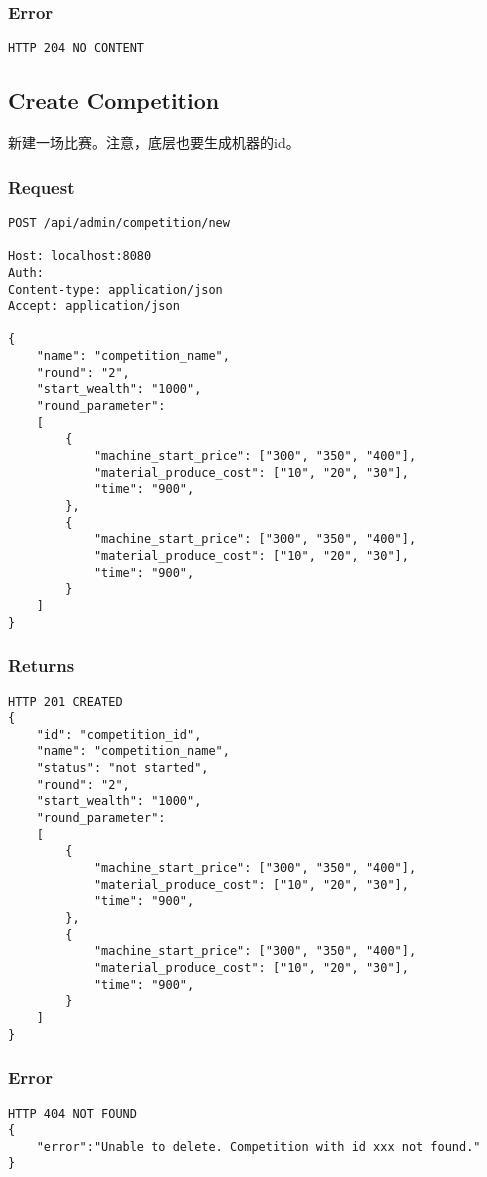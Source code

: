 \documentclass{article}
\begin{document}
\subsubsection*{Error}
\begin{lstlisting}
HTTP 204 NO CONTENT
\end{lstlisting}

\subsection{Create Competition}
新建一场比赛。注意，底层也要生成机器的id。

\subsubsection*{Request}
\begin{lstlisting}
POST /api/admin/competition/new

Host: localhost:8080
Auth:
Content-type: application/json
Accept: application/json

{
    "name": "competition_name",
    "round": "2",
    "start_wealth": "1000", 
    "round_parameter":
    [
        {
            "machine_start_price": ["300", "350", "400"],
            "material_produce_cost": ["10", "20", "30"],
            "time": "900",
        },
        {
            "machine_start_price": ["300", "350", "400"],
            "material_produce_cost": ["10", "20", "30"],
            "time": "900",
        }
    ]
}
\end{lstlisting}

\subsubsection*{Returns}
\begin{lstlisting}
HTTP 201 CREATED
{
    "id": "competition_id",
    "name": "competition_name",
    "status": "not started",
    "round": "2",
    "start_wealth": "1000", 
    "round_parameter":
    [
        {
            "machine_start_price": ["300", "350", "400"],
            "material_produce_cost": ["10", "20", "30"],
            "time": "900",
        },
        {
            "machine_start_price": ["300", "350", "400"],
            "material_produce_cost": ["10", "20", "30"],
            "time": "900",
        }
    ]
}

\end{lstlisting}

\subsubsection*{Error}
\begin{lstlisting}
HTTP 404 NOT FOUND
{
    "error":"Unable to delete. Competition with id xxx not found."
}
\end{lstlisting}
\end{document}
